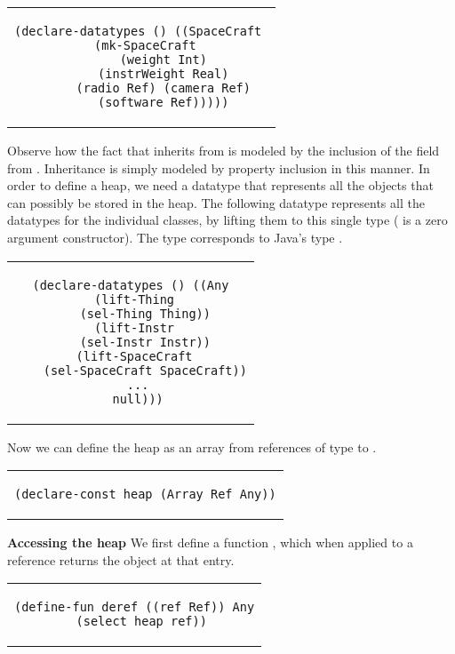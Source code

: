 \begin{center}
\begin{tabular}{c}
\small
\begin{lstlisting}  
(declare-datatypes () ((SpaceCraft 
  (mk-SpaceCraft 
      (weight Int)
      (instrWeight Real)
      (radio Ref) (camera Ref)
      (software Ref)))))
\end{lstlisting}
\end{tabular}
\end{center}

\noindent Observe how the fact that  inherits from
 is modeled by the inclusion of the  field
from . Inheritance is simply modeled by property
inclusion in this manner.  In order to define a heap, we need a
datatype that represents all the objects that can possibly be stored
in the heap. The following datatype  represents all the
datatypes for the individual classes, by lifting them to this single
type ( is a zero argument constructor). The type 
corresponds to Java's type .

\begin{center}
\begin{tabular}{c}
\small
\begin{lstlisting}
(declare-datatypes () ((Any
  (lift-Thing 
    (sel-Thing Thing))
  (lift-Instr 
    (sel-Instr Instr))
  (lift-SpaceCraft 
    (sel-SpaceCraft SpaceCraft))
  ...
  null)))
\end{lstlisting}
\end{tabular}
\end{center}

\noindent Now we can define the heap as an array from references of
type  to .

\begin{center}
\begin{tabular}{c}
\small
\begin{lstlisting}
(declare-const heap (Array Ref Any))
\end{lstlisting}
\end{tabular}
\end{center}

\textbf{Accessing the heap} We first define a function ,
which when applied to a reference returns the  object at
that entry.

\begin{center}
\begin{tabular}{c}
\small
\begin{lstlisting}
(define-fun deref ((ref Ref)) Any
  (select heap ref))
\end{lstlisting}
\end{tabular}
\end{center}

